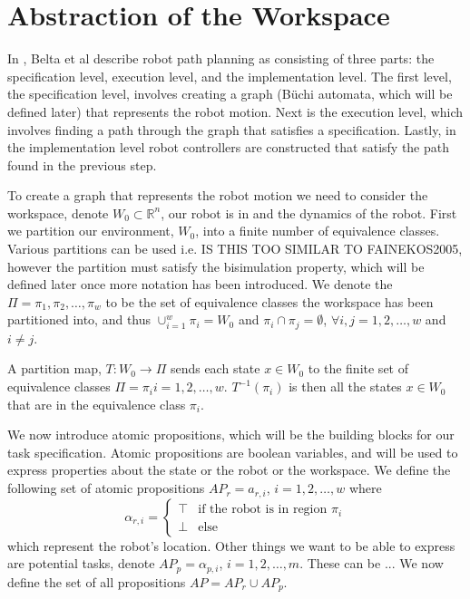 \section{Abstraction of the Workspace}
In \cite{belta07}, Belta et al describe robot path planning as consisting of three parts: the specification level, execution level, and the implementation level. The first level, the specification level, involves creating a graph (B\"{u}chi automata, which will be defined later) that represents the robot motion. Next is the execution level, which involves finding a path through the graph that satisfies a specification. Lastly, in the implementation level robot controllers are constructed that satisfy the path found in the previous step. 

To create a graph that represents the robot motion we need to consider the workspace, denote $W_0 \subset \mathbb{R}^n$, our robot is in and the dynamics of the robot. First we partition our environment, $W_0$, into a finite number of equivalence classes. Various partitions can be used i.e. \cite{belta04} IS THIS TOO SIMILAR TO FAINEKOS2005, however the partition must satisfy the bisimulation property, which will be defined later once more notation has been introduced. We denote the $\Pi = {\pi_1, \pi_2, \dots, \pi_w}$ to be the set of equivalence classes the workspace has been partitioned into, and thus $\cup_{i=1}^w \pi_i = W_0$ and $\pi_i \cap \pi_j = \emptyset$, $\forall i,j=1,2,\dots,w$ and $i\neq j$. 

\begin{definition}
\label{defLF}
A partition map, $T: W_0 \rightarrow \Pi$ sends each state $x \in W_0$ to the finite set of equivalence classes $\Pi = {\pi_i} i = 1,2,\dots ,w$. $T^{-1}(\pi_i)$ is then all the states $x \in W_0$ that are in the equivalence class $\pi_i$. 
\end{definition} 

We now introduce atomic propositions, which will be the building blocks for our task specification. Atomic propositions are boolean variables, and will be used to express properties about the state or the robot or the workspace. We define the following set of atomic propositions $AP_r = {a_{r,i}}$, $i=1,2,\dots,w$ where 
\[\alpha_{r,i} =  \begin{cases}
\top & \text{if the robot is in region $\pi_i$} \\
\bot & \text{else}
\end{cases}
\]
which represent the robot's location. Other things we want to be able to express are potential tasks, denote $AP_p = {\alpha_{p,i}}$, $i=1,2,\dots,m$. These can be ...
We now define the set of all propositions $AP = AP_r \cup AP_p$.

